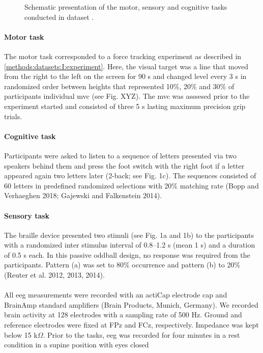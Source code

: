 \begin{figure}[h]
\begin{center}

\caption[Schematic presentation of the motor, sensory and cognitive tasks conducted in dataset .]{Schematic presentation of the motor, sensory and cognitive tasks conducted in dataset .}
\label{fig:DSII_exp3}
\end{center}
\end{figure}

\paragraph{Motor task}
The motor task corresponded to a force tracking experiment as described in \autoref{methods:datasets:I:experiment}. Here, the visual target was a line that moved from the right to the left on the screen for 90 s and changed level every 3 s in randomized order between heights that represented 10\%, 20\% and 30\% of participants individual \gls{mvc} (see Fig. XYZ). The \gls{mvc} was asssesed prior to the experiment started and consisted of three 5 s lasting maximum precision grip trials.

\paragraph{Cognitive task}
Participants were asked to listen to a sequence of letters presented via two speakers behind them and press the foot
switch with the right foot if a letter appeared again two letters later (2-back; see Fig. 1c). The sequences consisted of 60 letters in predefined randomized selections with 20\% matching rate (Bopp and Verhaeghen 2018; Gajewski and Falkenstein 2014).

\paragraph{Sensory task}
The braille device presented two stimuli (see Fig. 1a and 1b) to the participants with a randomized inter stimulus
interval of 0.8–1.2 s (mean 1 s) and a duration of 0.5 s each. In this passive oddball design, no response was
required from the participants. Pattern (a) was set to 80\% occurrence and pattern (b) to 20\% (Reuter et al. 2012, 2013, 2014).\\
\\
All \gls{eeg} measurements were recorded with an actiCap electrode cap and BrainAmp standard amplifiers (Brain Products, Munich, Germany). We recorded brain activity at 128 electrodes with a sampling rate of 500 Hz. Ground and reference electrodes were fixed at FPz and FCz, respectively. Impedance was kept below 15 k$\Omega$. Prior to the tasks, \gls{eeg} was recorded for four minutes in a rest condition in a supine position with eyes closed

